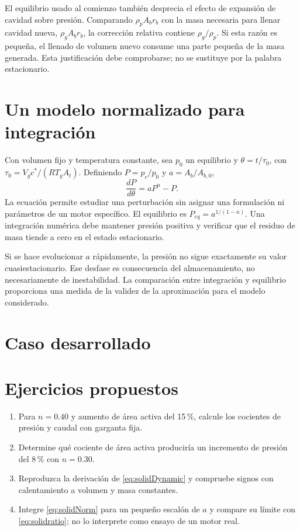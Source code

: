 El equilibrio usado al comienzo también desprecia el efecto de expansión de cavidad sobre presión. Comparando $\rho_pA_br_b$ con la masa necesaria para llenar cavidad nueva, $\rho_gA_br_b$, la corrección relativa contiene $\rho_g/\rho_p$. Si esta razón es pequeña, el llenado de volumen nuevo consume una parte pequeña de la masa generada. Esta justificación debe comprobarse; no se sustituye por la palabra estacionario.
\section{Un modelo normalizado para integración}
Con volumen fijo y temperatura constante, sea $p_0$ un equilibrio y $\theta=t/\tau_0$, con $\tau_0=V_gc^*/(RT_gA_t)$. Definiendo $P=p_c/p_0$ y $a=A_b/A_{b,0}$,
\begin{equation}\label{eq:solidNorm}
 \frac{dP}{d\theta}=aP^n-P.
\end{equation}
La ecuación permite estudiar una perturbación sin asignar una formulación ni parámetros de un motor específico. El equilibrio es $P_{eq}=a^{1/(1-n)}$. Una integración numérica debe mantener presión positiva y verificar que el residuo de masa tiende a cero en el estado estacionario.

Si se hace evolucionar $a$ rápidamente, la presión no sigue exactamente su valor cuasiestacionario. Ese desfase es consecuencia del almacenamiento, no necesariamente de inestabilidad. La comparación entre integración y equilibrio proporciona una medida de la validez de la aproximación para el modelo considerado.
\section{Caso desarrollado}

\section{Ejercicios propuestos}
\begin{enumerate}
\item Para $n=0.40$ y aumento de área activa del 15\,\%, calcule los cocientes de presión y caudal con garganta fija.
\item Determine qué cociente de área activa produciría un incremento de presión del 8\,\% con $n=0.30$.
\item Reproduzca la derivación de \eqref{eq:solidDynamic} y compruebe signos con calentamiento a volumen y masa constantes.
\item Integre \eqref{eq:solidNorm} para un pequeño escalón de $a$ y compare su límite con \eqref{eq:solidratio}; no lo interprete como ensayo de un motor real.
\end{enumerate}


\studiumchaptercheck
